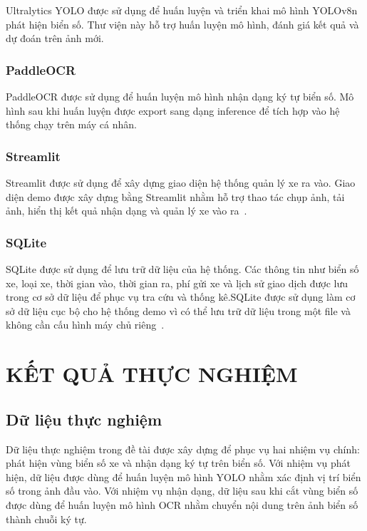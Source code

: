 \documentclass[13pt,a4paper]{report}
\begin{document}
Ultralytics YOLO được sử dụng để huấn luyện và triển khai mô hình YOLOv8n phát hiện biển số. Thư viện này hỗ trợ huấn luyện mô hình, đánh giá kết quả và dự đoán trên ảnh mới.

\subsection{PaddleOCR}

PaddleOCR được sử dụng để huấn luyện mô hình nhận dạng ký tự biển số. Mô hình sau khi huấn luyện được export sang dạng inference để tích hợp vào hệ thống chạy trên máy cá nhân.

\subsection{Streamlit}

Streamlit được sử dụng để xây dựng giao diện hệ thống quản lý xe ra vào.
Giao diện demo được xây dựng bằng Streamlit nhằm hỗ trợ thao tác chụp ảnh, tải ảnh, hiển thị kết quả nhận dạng và quản lý xe vào ra~\cite{streamlit_docs}.

\subsection{SQLite}

SQLite được sử dụng để lưu trữ dữ liệu của hệ thống. Các thông tin như biển số xe, loại xe, thời gian vào, thời gian ra, phí gửi xe và lịch sử giao dịch được lưu trong cơ sở dữ liệu để phục vụ tra cứu và thống kê.SQLite được sử dụng làm cơ sở dữ liệu cục bộ cho hệ thống demo vì có thể lưu trữ dữ liệu trong một file và không cần cấu hình máy chủ riêng~\cite{sqlite_docs,python_sqlite3}.


\chapter{KẾT QUẢ THỰC NGHIỆM}

\section{Dữ liệu thực nghiệm}

Dữ liệu thực nghiệm trong đề tài được xây dựng để phục vụ hai nhiệm vụ chính: phát hiện vùng biển số xe và nhận dạng ký tự trên biển số. Với nhiệm vụ phát hiện, dữ liệu được dùng để huấn luyện mô hình YOLO nhằm xác định vị trí biển số trong ảnh đầu vào. Với nhiệm vụ nhận dạng, dữ liệu sau khi cắt vùng biển số được dùng để huấn luyện mô hình OCR nhằm chuyển nội dung trên ảnh biển số thành chuỗi ký tự.
\end{document}
